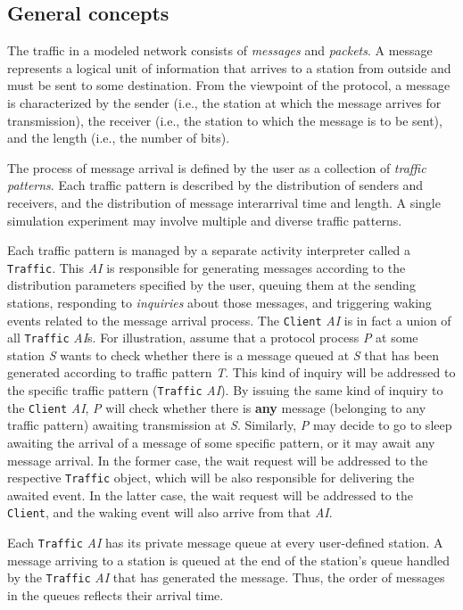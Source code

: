 \subsection{General concepts}
\label{rm_cl_gc}

The traffic in a modeled network consists of {\em messages\/} and
{\em packets}.
A message represents a logical unit of information that arrives to a
station from outside and must be sent to some destination.
From the viewpoint of the protocol,
a message is characterized by the sender (i.e., the station at which
the message arrives for transmission), the receiver (i.e., the station to
which the message is to be sent), and the length (i.e., the number of
bits).

The process of message arrival is defined by the user
as a collection of {\em traffic patterns}.
Each traffic pattern is described by the distribution of senders
and receivers, and the distribution of message interarrival time and
length.
A single simulation experiment may involve multiple and diverse
traffic patterns.

Each traffic pattern is managed by a separate activity interpreter called
a {\tt Traffic}.
This {\em AI\/} is responsible for generating messages according to the
distribution parameters specified by the user, queuing them at the
sending stations, responding to {\em inquiries\/} about those
messages, and triggering waking events related to the message arrival
process.
The {\tt Client} {\em AI\/} is in fact a union of all {\tt Traffic}
{\em AI\/}s.
For illustration, assume that a protocol process {\em P\/} at some
station {\em S\/} wants to check whether there is a message queued at
{\em S\/} that
has been generated according to traffic pattern {\em T}.
This kind of inquiry will be addressed to the specific traffic pattern
({\tt Traffic} {\em AI\/}).
By issuing the same kind of inquiry to the {\tt Client} {\em AI},
{\em P\/} will check
whether there is {\bf any} message (belonging to any traffic pattern)
awaiting transmission at {\em S}.
Similarly, {\em P\/} may decide to go to sleep awaiting the arrival of
a message of some specific pattern, or it may await any message arrival.
In the former case, the wait request will be addressed to the respective
{\tt Traffic} object, which will be also responsible for delivering the
awaited event.
In the latter case, the wait request will be addressed to the {\tt Client},
and the waking event will also arrive from that {\em AI}.

Each {\tt Traffic}  {\em AI\/}
has its private message queue at every user-defined station.
A message arriving to a station is queued at the end of the station's queue 
handled by the {\tt Traffic} {\em AI\/} that has generated the message.
Thus, the order of messages in the queues reflects their arrival time.

